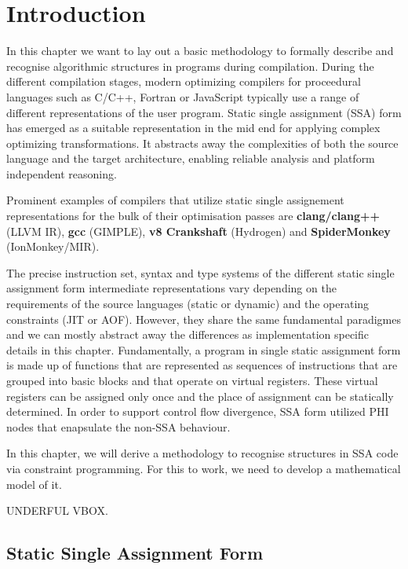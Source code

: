 
\section{Introduction}

    In this chapter we want to lay out a basic methodology to formally describe
    and recognise algorithmic structures in programs during compilation.
    During the different compilation stages, modern optimizing compilers for
    proceedural languages such as C/C++, Fortran or JavaScript typically use
    a range of different representations of the user program.
    Static single assignment (SSA) form has emerged as a suitable representation
    in the mid end for applying complex optimizing transformations.
    It abstracts away the complexities of both the source language and the
    target architecture, enabling reliable analysis and platform independent
    reasoning.

    Prominent examples of compilers that utilize static single assignement
    representations for the bulk of their optimisation passes are
    {\bf clang/clang++} (LLVM IR), {\bf gcc} (GIMPLE), {\bf v8 Crankshaft}
    (Hydrogen) and {\bf SpiderMonkey} (IonMonkey/MIR).

    The precise instruction set, syntax and type systems of the different static
    single assignment form intermediate representations vary depending on the
    requirements of the source languages (static or dynamic) and the operating
    constraints (JIT or AOF).
    However, they share the same fundamental paradigmes and we can mostly
    abstract away the differences as implementation specific details in this
    chapter.
    Fundamentally, a program in single static assignment form is made up of
    functions that are represented as sequences of instructions that are grouped
    into basic blocks and that operate on virtual registers.
    These virtual registers can be assigned only once and the place of
    assignment can be statically determined.
    In order to support control flow divergence, SSA form utilized PHI nodes
    that enapsulate the non-SSA behaviour.

    In this chapter, we will derive a methodology to recognise structures in 
    SSA code via constraint programming.
    For this to work, we need to develop a mathematical model of it.

    UNDERFUL VBOX.

\subsection{Static Single Assignment Form}

